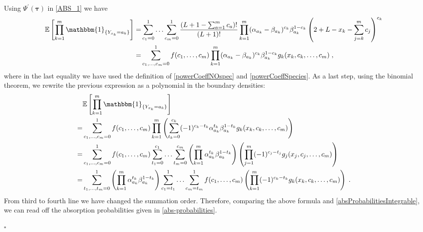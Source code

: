 \documentclass[10pt]{article}
\numberwithin{equation}{section}
\numberwithin{equation}{subsection}
\newcommand{\co}{\;,}
\newcommand{\dt}{\;.}
\begin{document}
Using $\Psi^{'}(\bm{\tau})$ in \eqref{ABS_1} we have 
\begin{align}
	\mathbb{E}\left[\prod_{k=1}^{m}\mathbbm{1}_{\{Y_{x_{k}}=a_{k}\}}\right]=&\sum_{c_{1}=0}^{1}\ldots\sum_{c_{m}=0}^{1}\frac{(L+1-\sum_{a=1}^{m}c_{a})!}{(L+1)!}\prod_{k=1}^{m}(\alpha_{a_{k}}-\beta_{a_{k}})^{c_{k}}\beta_{a_{k}}^{1-c_{k}}\left(2+L-x_{k}-\sum_{j=k}^{m}c_{j}\right)^{c_{k}}\nonumber\\
	=&\sum_{c_{1},\ldots,c_{m}=0}^{1}
	f(c_{1},\ldots,c_{m})\prod_{k=1}^{m}(\alpha_{a_{k}}-\beta_{a_{k}})^{c_{k}}\beta_{a_{k}}^{1-c_{k}}g_{k}(x_{k},c_{k},\ldots,c_{m})\co
\end{align}
where in the last equality we have used the definition of \eqref{powerCoeffNOspec} and \eqref{powerCoeffSpecies}.
As a last step, using the binomial theorem, we rewrite the previous expression as a polynomial in the boundary densities: 
\begin{align}
	&\mathbb{E}\left[\prod_{k=1}^{m}\mathbbm{1}_{\{Y_{x_{k}}=a_{k}\}}\right]\nonumber\\=&
	\sum_{c_{1},\ldots,c_{m}=0}^{1}
	f(c_{1},\ldots,c_{m})\prod_{k=1}^{m}\left(\sum_{t_{k}=0}^{c_{k}}(-1)^{c_{k}-t_{k}}\alpha_{a_{k}}^{t_{k}}\beta_{a_{k}}^{1-t_{k}}g_{k}(x_{k},c_{k},\ldots,c_{m})\right)\nonumber\\
	=&\sum_{c_{1},\ldots,c_{m}=0}^{1}
	f(c_{1},\ldots,c_{m})\sum_{t_{1}=0}^{c_{1}}\ldots\sum_{t_{m}=0}^{c_{m}}\left(\prod_{k=1}^{m}\alpha_{a_{k}}^{t_{k}}\beta_{a_{k}}^{1-t_{k}}\right)\left(\prod_{j=1}^{m}(-1)^{c_{j}-t_{j}}g_{j}(x_{j},c_{j},\ldots,c_{m})\right)\nonumber\\
	=&\sum_{t_{1},\ldots,t_{m}=0}^{1}\left(\prod_{k=1}^{m}\alpha_{a_{k}}^{t_{k}}\beta_{a_{k}}^{1-t_{k}}\right)\sum_{c_{1}=t_{1}}^{1}\ldots\sum_{c_{m}=t_{m}}^{1}f(c_{1},\ldots,c_{m})\left(\prod_{k=1}^{m}(-1)^{c_{k}-t_{k}}g_{k}(x_{k},c_{k},\ldots,c_{m})\right)\dt
\end{align}
From third to fourth line we have changed the summation order. Therefore, comparing the above formula and \eqref{absProbabilitiesIntegrable}, we can read off the absorption probabilities given in \eqref{abs-probabilities}.
\begin{flushright}
	$\square$
\end{flushright}
\end{document}
